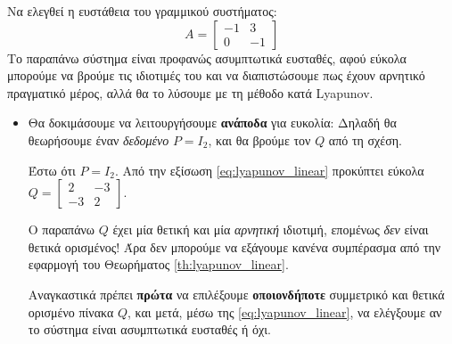 \documentclass[11pt,a4paper,notitlepage,fleqn]{article}
\begin{document}
\begin{exercise}[Παράδειγμα]
	Να ελεγθεί η ευστάθεια του γραμμικού συστήματος:
	\[
	A = \left[
	\begin{matrix}
	-1 & 3 \\ 0 & -1
	\end{matrix}\right]
	\]
	\tcblower
	Το παραπάνω σύστημα είναι προφανώς ασυμπτωτικά ευσταθές,
	αφού εύκολα μπορούμε να βρούμε τις ιδιοτιμές του και να διαπιστώσουμε πως έχουν
	αρνητικό πραγματικό μέρος,
    αλλά θα το λύσουμε με τη μέθοδο κατά Lyapunov.

    \begin{itemize}
    \item	Θα δοκιμάσουμε να λειτουργήσουμε \textbf{ανάποδα} για ευκολία:
    	Δηλαδή θα θεωρήσουμε έναν \textit{δεδομένο} \( P=I_2 \), και
    	θα βρούμε τον \( Q \) από τη σχέση.

    	Έστω ότι \( P = I_2 \). Από την εξίσωση \eqref{eq:lyapunov_linear}
    	προκύπτει εύκολα \( Q = \left[\begin{matrix}
    	2 & -3 \\ -3 & 2
    	\end{matrix}\right] \).

    	Ο παραπάνω \( Q \) έχει μία θετική και μία \textit{αρνητική}
    	ιδιοτιμή, επομένως \textit{δεν} είναι θετικά ορισμένος! Άρα
    	δεν μπορούμε να εξάγουμε κανένα συμπέρασμα από την εφαρμογή
    	του Θεωρήματος \ref{th:lyapunov_linear}.

    	Αναγκαστικά πρέπει \textbf{πρώτα} να επιλέξουμε \textbf{οποιονδήποτε} συμμετρικό και θετικά ορισμένο πίνακα
    	\( Q \), και μετά, μέσω της \eqref{eq:lyapunov_linear}, να
    	ελέγξουμε αν το σύστημα είναι ασυμπτωτικά ευσταθές ή όχι.
    \end{itemize}
\end{exercise}
\end{document}
